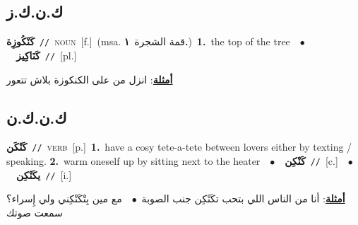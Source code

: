 \documentclass[10pt,a4paper,twoside]{article} %
\begin{document}
\begin{multicols}{2}
\vspace{-3mm}
\subsection*{\color{blue}\foreignlanguage{arabic}{ك.ن.ك.ز}\color{blue}{}} 

{\setlength\topsep{0pt}\textbf{\foreignlanguage{arabic}{كَنْكُوزِة}}\ {\color{gray}\texttt{//}\color{black}}\ \textsc{noun}\ [f.]\ \color{gray}(msa. \foreignlanguage{arabic}{قمة الشجرة}~\foreignlanguage{arabic}{\textbf{١.}})\color{black}\ \textbf{1.}~the top of the tree\ \ $\bullet$\ \ \setlength\topsep{0pt}\textbf{\foreignlanguage{arabic}{كَنَاكِيز}}\ {\color{gray}\texttt{//}\color{black}}\ [pl.]\  \begin{flushright}\color{gray}\foreignlanguage{arabic}{\textbf{\underline{\foreignlanguage{arabic}{أمثلة}}}: انزل من على الكنكوزة بلاش تتعور}\end{flushright}\color{black}} \vspace{2mm}

\vspace{-3mm}
\subsection*{\color{blue}\foreignlanguage{arabic}{ك.ن.ك.ن}\color{blue}{}} 

{\setlength\topsep{0pt}\textbf{\foreignlanguage{arabic}{كَنْكَن}}\ {\color{gray}\texttt{//}\color{black}}\ \textsc{verb}\ [p.]\ \textbf{1.}~have a cosy tete-a-tete between lovers either by texting / speaking.  \textbf{2.}~warm oneself up by sitting next to the heater\ \ $\bullet$\ \ \setlength\topsep{0pt}\textbf{\foreignlanguage{arabic}{كَنْكِن}}\ {\color{gray}\texttt{//}\color{black}}\ [c.]\ \ $\bullet$\ \ \setlength\topsep{0pt}\textbf{\foreignlanguage{arabic}{يكَنْكِن}}\ {\color{gray}\texttt{//}\color{black}}\ [i.]\  \begin{flushright}\color{gray}\foreignlanguage{arabic}{\textbf{\underline{\foreignlanguage{arabic}{أمثلة}}}: أنا من الناس اللي بتحب تكَنْكِن جنب الصوبة\ $\bullet$\ \  مع مين بِتْكَنْكِني ولي إِسراء؟ سمعت صوتك}\end{flushright}\color{black}} \vspace{2mm}


\end{multicols}
\end{document}
